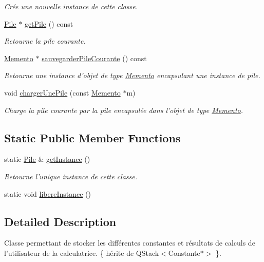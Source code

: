 \begin{DoxyCompactItemize}
\begin{DoxyCompactList}\small\item\em \-Crée une nouvelle instance de cette classe. \end{DoxyCompactList}\item 
\hyperlink{classPile}{\-Pile} $\ast$ \hyperlink{classPile_aeef72130e2709198369529abc2a0155e}{get\-Pile} () const 
\begin{DoxyCompactList}\small\item\em \-Retourne la pile courante. \end{DoxyCompactList}\item 
\hyperlink{classPile_1_1Memento}{\-Memento} $\ast$ \hyperlink{classPile_a5f6591defa8702b06872735d4043c754}{sauvegarder\-Pile\-Courante} () const 
\begin{DoxyCompactList}\small\item\em \-Retourne une instance d'objet de type \hyperlink{classPile_1_1Memento}{\-Memento} encapsulant une instance de pile. \end{DoxyCompactList}\item 
void \hyperlink{classPile_a14b191f65aca9842691235fd8726dd21}{charger\-Une\-Pile} (const \hyperlink{classPile_1_1Memento}{\-Memento} $\ast$m)
\begin{DoxyCompactList}\small\item\em \-Charge la pile courante par la pile encapsulée dans l'objet de type \hyperlink{classPile_1_1Memento}{\-Memento}. \end{DoxyCompactList}\end{DoxyCompactItemize}
\subsection*{\-Static \-Public \-Member \-Functions}
\begin{DoxyCompactItemize}
\item 
static \hyperlink{classPile}{\-Pile} \& \hyperlink{classPile_a8a8779a9093f6cd64c6aed57b08e93bd}{get\-Instance} ()
\begin{DoxyCompactList}\small\item\em \-Retourne l'unique instance de cette classe. \end{DoxyCompactList}\item 
static void \hyperlink{classPile_ac1c6dc99e7b12586303e980b6c44e686}{libere\-Instance} ()
\end{DoxyCompactItemize}


\subsection{\-Detailed \-Description}
\-Classe permettant de stocker les différentes constantes et résultats de calculs de l'utilisateur de la calculatrice. \{ hérite de \-Q\-Stack$<$\-Constante$\ast$$>$ \}. 

